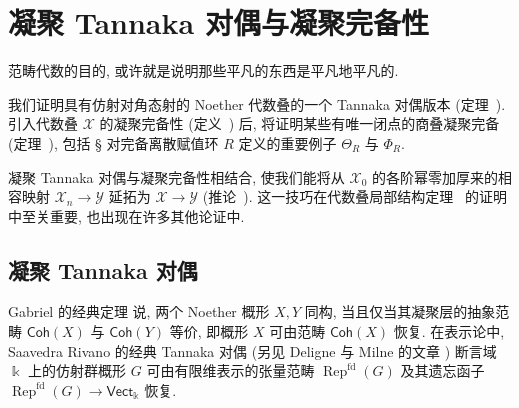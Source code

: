 \section{凝聚 Tannaka 对偶与凝聚完备性}\label{src:7.6}
\begin{epigraph}
范畴代数的目的, 或许就是说明那些平凡的东西是平凡地平凡的.
\end{epigraph}
我们证明具有仿射对角态射的 Noether 代数叠的一个 Tannaka 对偶版本 (定理~). 引入代数叠 $\mathcal X$ 的凝聚完备性 (定义~) 后, 将证明某些有唯一闭点的商叠凝聚完备 (定理~), 包括 \S{} 对完备离散赋值环 $R$ 定义的重要例子 $\Theta_R$ 与 $\Phi_R$.

凝聚 Tannaka 对偶与凝聚完备性相结合, 使我们能将从 $\mathcal X_0$ 的各阶幂零加厚来的相容映射 $\mathcal X_n\to\mathcal Y$ 延拓为 $\mathcal X\to\mathcal Y$ (推论~). 这一技巧在代数叠局部结构定理~ 的证明中至关重要, 也出现在许多其他论证中.

\subsection{凝聚 Tannaka 对偶}\label{src:7.6.1-subsection}
Gabriel 的经典定理 \cite{Gab62} 说, 两个 Noether 概形 $X,Y$ 同构, 当且仅当其凝聚层的抽象范畴 $\mathsf{Coh}(X)$ 与 $\mathsf{Coh}(Y)$ 等价, 即概形 $X$ 可由范畴 $\mathsf{Coh}(X)$ 恢复. 在表示论中, Saavedra Rivano 的经典 Tannaka 对偶 \cite{SR72} (另见 Deligne 与 Milne 的文章 \cite[第二章]{DMOS82}) 断言域 $\Bbbk$ 上的仿射群概形 $G$ 可由有限维表示的张量范畴 $\operatorname{Rep}^{\mathrm{fd}}(G)$ 及其遗忘函子 $\operatorname{Rep}^{\mathrm{fd}}(G)\to\mathsf{Vect}_{\Bbbk}$ 恢复.

